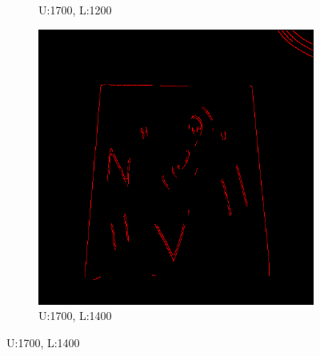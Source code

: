 \documentclass[11pt]{article}
\begin{document}
\begin{figure}[H]
\begin{subfigure}[t]{.25\textwidth}
		\caption{U:1700, L:1200}
	\end{subfigure}
\hfill
	\begin{subfigure}[t]{.25\textwidth}
		\centering
		\includegraphics[scale=0.3]{pics/normalThreshTest/Upper1700lower1400kernel5.png}
		\caption{U:1700, L:1400}	
	\end{subfigure}



\end{figure}
\end{document}

